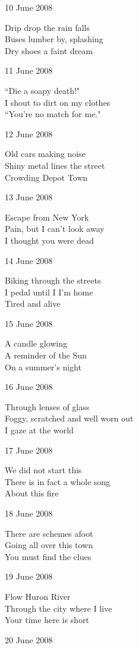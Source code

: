 \documentclass[12pt]{article}
\begin{document}
10 June 2008

Drip drop the rain falls \\
Buses lumber by, splashing \\
Dry shoes a faint dream

11 June 2008

``Die a soapy death!" \\
I shout to dirt on my clothes \\
``You're no match for me."

12 June 2008

Old cars making noise \\
Shiny metal lines the street \\
Crowding Depot Town

13 June 2008

Escape from New York \\
Pain, but I can't look away \\
I thought you were dead

14 June 2008

Biking through the streets \\
I pedal until I I'm home \\
Tired and alive

15 June 2008

A candle glowing \\
A reminder of the Sun \\
On a summer's night

16 June 2008

Through lenses of glass \\
Foggy, scratched and well worn out \\
I gaze at the world


\newpage

17 June 2008

We did not start this \\
There is in fact a whole song \\
About this fire

18 June 2008

There are schemes afoot \\
Going all over this town \\
You must find the clues

19 June 2008

Flow Huron River \\
Through the city where I live \\
Your time here is short

20 June 2008
\end{document}
